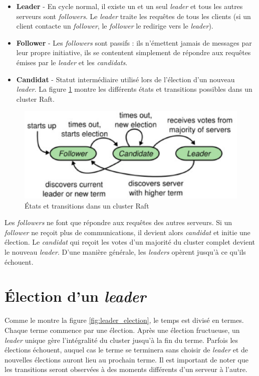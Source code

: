 \begin{itemize}
    \item \textbf{Leader} -
        En cycle normal, il existe un et un seul \emph{leader} et tous les autres
        serveurs sont \emph{followers}. Le \emph{leader} traite les requêtes de
        tous les clients (si un client contacte un \emph{follower}, le
        \emph{follower} le redirige vers le \emph{leader}).
    \item \textbf{Follower} -
        Les \emph{followers} sont passifs : ils n'émettent jamais de messages par
        leur propre initiative, ils se contentent simplement de répondre aux
        requêtes émises par le \emph{leader} et les \emph{candidats}.
    \item \textbf{Candidat} -
        Statut intermédiaire utilisé lors de l'élection d'un nouveau
        \emph{leader}. La figure \ref{fig:raft_server_states} montre les différents états
        et transitions possibles dans un cluster Raft.
\end{itemize}

\begin{figure}[H]
    \centerline{\includegraphics[width=.47\textwidth]{img/raft_server_states}}
    \caption{États et transitions dans un cluster Raft}
    \label{fig:raft_server_states}
\end{figure}

Les \emph{followers} ne font que répondre aux requêtes des autres serveurs. Si
un \emph{follower} ne reçoit plus de communications, il devient alors
\emph{candidat} et initie une élection. Le \emph{candidat} qui reçoit les votes
d'un majorité du cluster complet devient le nouveau \emph{leader}. D'une manière
générale, les \emph{leaders} opèrent jusqu'à ce qu'ils échouent.

\section{Élection d'un \emph{leader}}

Comme le montre la figure \ref{fig:leader_election}, le temps est divisé en
termes. Chaque terme commence par une élection. Après une élection fructueuse,
un \emph{leader} unique gère l'intégralité du cluster jusqu'à la fin du terme.
Parfois les élections échouent, auquel cas le terme se terminera sans choisir de
\emph{leader} et de nouvelles élections auront lieu au prochain terme. Il est
important de noter que les transitions seront observées à des moments différents
d'un serveur à l'autre.

